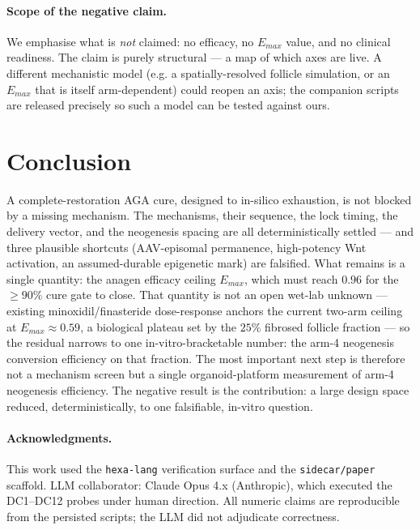 \documentclass[11pt,a4paper]{article}
\begin{document}
\paragraph{Scope of the negative claim.} We emphasise what is \emph{not} claimed:
no efficacy, no $E_{max}$ value, and no clinical readiness. The claim is purely
structural --- a map of which axes are live. A different mechanistic model (e.g. a
spatially-resolved follicle simulation, or an $E_{max}$ that is itself
arm-dependent) could reopen an axis; the companion scripts are released precisely
so such a model can be tested against ours.

\section{Conclusion}
\label{sec:conclusion}

A complete-restoration AGA cure, designed to in-silico exhaustion, is not blocked by
a missing mechanism. The mechanisms, their sequence, the lock timing, the delivery
vector, and the neogenesis spacing are all deterministically settled --- and three
plausible shortcuts (AAV-episomal permanence, high-potency Wnt activation, an
assumed-durable epigenetic mark) are falsified. What remains is a single
quantity: the anagen efficacy ceiling $E_{max}$, which must reach $0.96$ for the
$\geq 90\%$ cure gate to close. That quantity is not an open wet-lab unknown ---
existing minoxidil/finasteride dose-response anchors the current two-arm ceiling at
$E_{max}\approx 0.59$, a biological plateau set by the $25\%$ fibrosed follicle
fraction --- so the residual narrows to one in-vitro-bracketable number: the arm-4
neogenesis conversion efficiency on that fraction. The most important next step is
therefore not a mechanism screen but a single organoid-platform measurement of
arm-4 neogenesis efficiency. The negative result is the contribution: a large
design space reduced, deterministically, to one falsifiable, in-vitro question.

\paragraph{Acknowledgments.}
This work used the \texttt{hexa-lang} verification surface and the
\texttt{sidecar/paper} scaffold. LLM collaborator: Claude Opus 4.x (Anthropic),
which executed the DC1--DC12 probes under human direction. All numeric claims are
reproducible from the persisted scripts; the LLM did not adjudicate correctness.
\end{document}
